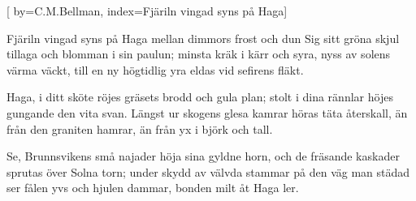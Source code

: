 


[ 	%
	by={C.M.Bellman},	%
	index={Fjäriln vingad syns på Haga}]	%
	
\beginverse*		%
Fjäriln vingad syns på Haga
mellan dimmors frost och dun
Sig sitt gröna skjul tillaga
och blomman i sin paulun;
minsta kräk i kärr och syra,
nyss av solens värma väckt,
till en ny högtidlig yra
eldas vid sefirens fläkt.
\endverse			%

\beginverse*		%
Haga, i ditt sköte röjes
gräsets brodd och gula plan;
stolt i dina rännlar höjes
gungande den vita svan.
Längst ur skogens glesa kamrar
höras täta återskall,
än från den graniten hamrar,
än från yx i björk och tall.
\endverse			%

\beginverse*		%
Se, Brunnsvikens små najader
höja sina gyldne horn,
och de fräsande kaskader
sprutas över Solna torn;
under skydd av välvda stammar
på den väg man städad ser
fålen yvs och hjulen dammar,
bonden milt åt Haga ler.
\endverse			%
\endsong			%
